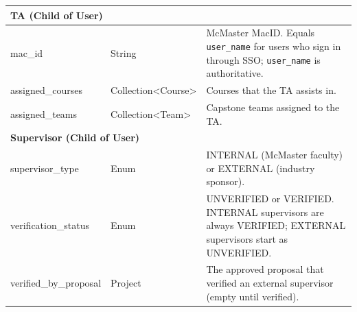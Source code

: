 \documentclass[12pt]{article}
\begin{document}
\begin{longtable}{|
      p{}|
      p{}|
      p{}|
  }
      \multicolumn{3}{|l|}{\textbf{TA (Child of User)}}\\ \hline
      mac\_id & String & McMaster MacID. Equals \texttt{user\_name} for users who sign in through SSO; \texttt{user\_name} is authoritative. \\ \hline
      assigned\_courses & Collection\textless Course\textgreater & Courses that the TA assists in. \\ \hline
      assigned\_teams & Collection\textless Team\textgreater & Capstone teams assigned to the TA. \\ \hline

      \multicolumn{3}{|l|}{\textbf{Supervisor (Child of User)}}\\ \hline
      supervisor\_type & Enum & INTERNAL (McMaster faculty) or EXTERNAL (industry sponsor). \\ \hline
      verification\_status & Enum & UNVERIFIED or VERIFIED. INTERNAL supervisors are always VERIFIED; EXTERNAL supervisors start as UNVERIFIED. \\ \hline
      verified\_by\_proposal & Project & The approved proposal that verified an external supervisor (empty until verified). \\ \hline


\end{longtable}
\end{document}
